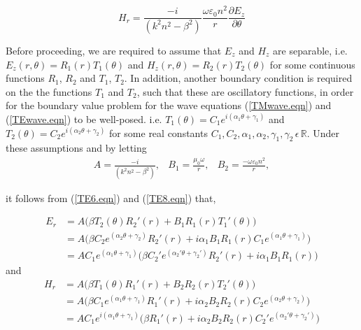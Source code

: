 \documentclass[12pt]{article}
\theoremstyle{definition}
\numberwithin{equation}{section}
\begin{document}
\begin{equation}
H_r = \frac{-i}{(k^2 n^2 -\beta^2 )}\frac{\omega\varepsilon_0 n^2}{r}\frac{\partial E_z}{\partial\theta}
\label{TM4.eqn}
\end{equation}

Before proceeding, we are required to assume that $E_z$ and $H_z$ are separable, i.e. $E_z (r,\theta)=R_1 (r)T_1 (\theta)$ and $H_z (r,\theta)=R_2 (r)T_2(\theta)$ for some continuous functions $R_1$, $R_2$ and $T_1$, $T_2$. In addition, another boundary condition is required on the the functions $T_1$ and $T_2$, such that these are oscillatory functions, in order for the boundary value problem for the wave equations (\ref{TMwave.eqn}) and (\ref{TEwave.eqn}) to be well-posed. i.e. $T_1 (\theta)=C_1 e^{i(\alpha_1\theta+\gamma_1 )}$ and $T_2 (\theta)=C_2 e^{i(\alpha_2\theta+\gamma_2 )}$ for some real constants $C_1 ,C_2, \alpha_1, \alpha_2, \gamma_1, \gamma_2\,\epsilon\,\mathbb{R}$. Under these assumptions and by letting 
\begin{equation}
\begin{array}{ccc} A=\frac{-i}{(k^2 n^2 -\beta^2 )}, & B_1=\frac{\mu_0\omega}{r}, & B_2=\frac{-\omega\varepsilon_0 n^2}{r},
\end{array} 
\nonumber
\end{equation}

it follows from (\ref{TE6.eqn}) and (\ref{TE8.eqn}) that,

\begin{align}
E_r &= A\bigg(\beta T_2 (\theta)R_2 '(r) + B_1 R_1 (r)T_1 '(\theta)\bigg)\nonumber
\\&= A\bigg(\beta C_2 e^{(\alpha_2\theta+\gamma_2 )}R_2 '(r) + i\alpha_1 B_1 R_1 (r)C_1 e^{(\alpha_1\theta+\gamma_1)}\bigg)\nonumber
\\&= AC_1 e^{(\alpha_1\theta+\gamma_1 )}\bigg(\beta C_2 ' e^{(\alpha_2 '\theta+\gamma_2 ')} R_2 '(r)+i\alpha_1 B_1 R_1 (r)\bigg)
\label{TM_sep1.eqn}
\end{align}
and
\begin{align}
H_r &= A\bigg(\beta T_1 (\theta)R_1 '(r) + B_2 R_2 (r)T_2 '(\theta)\bigg)\nonumber
\\&= A\bigg(\beta C_1 e^{(\alpha_1\theta+\gamma_1)}R_1 '(r) +i\alpha_2 B_2 R_2(r)C_2 e^{(\alpha_2\theta+\gamma_2 )}\bigg)\nonumber
\\&= AC_1 e^{i(\alpha_1\theta+\gamma_1)}\bigg(\beta R_1 '(r)+i\alpha_2 B_2 R_2 (r)C_2 ' e^{(\alpha_2 '\theta+\gamma_2 ')}\bigg)
\label{TM_sep2.eqn}
\end{align}
\end{document}
